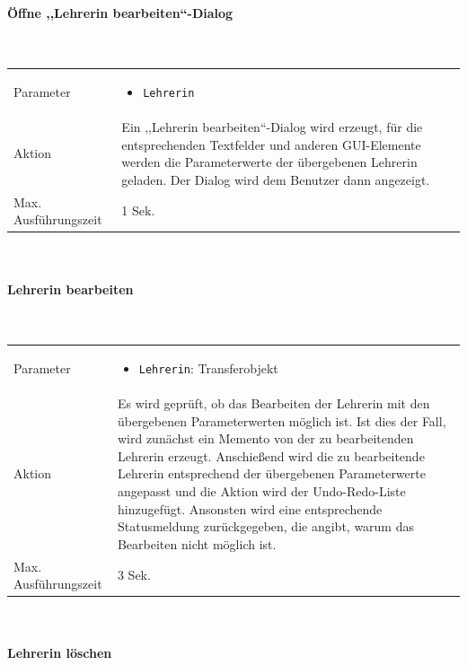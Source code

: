 \documentclass[fontsize=12pt,paper=a4,twoside]{scrartcl}
\begin{document}
\paragraph{Öffne ,,Lehrerin bearbeiten``-Dialog}\mbox{}\\

\begin{tabularx}{\textwidth}{p{4cm}X}
Parameter & \begin{itemize}[itemsep=0pt, leftmargin = 0.5cm]
			\item \texttt{Lehrerin}
			\end{itemize}\\
Aktion & Ein ,,Lehrerin bearbeiten``-Dialog wird erzeugt, für die entsprechenden Textfelder und anderen GUI-Elemente werden die Parameterwerte der übergebenen Lehrerin geladen. Der Dialog wird dem Benutzer dann angezeigt.\\
Max. Ausführungszeit & 1 Sek.
\end{tabularx}\\

\paragraph{Lehrerin bearbeiten}\mbox{}\\

\begin{tabularx}{\textwidth}{p{4cm}X}
Parameter & \begin{itemize}[itemsep=0pt, leftmargin = 0.5cm]
			\item \texttt{Lehrerin}: Transferobjekt
			\end{itemize}\\
Aktion & Es wird geprüft, ob das Bearbeiten der Lehrerin mit den übergebenen Parameterwerten möglich ist. Ist dies der Fall, wird zunächst ein Memento von der zu bearbeitenden Lehrerin erzeugt. Anschießend wird die zu bearbeitende Lehrerin entsprechend der übergebenen Parameterwerte angepasst und die Aktion wird der Undo-Redo-Liste hinzugefügt. Ansonsten wird eine entsprechende Statusmeldung zurückgegeben, die angibt, warum das Bearbeiten nicht möglich ist.\\
Max. Ausführungszeit & 3 Sek.
\end{tabularx}\\

\paragraph{Lehrerin löschen}\mbox{}\\
\end{document}
